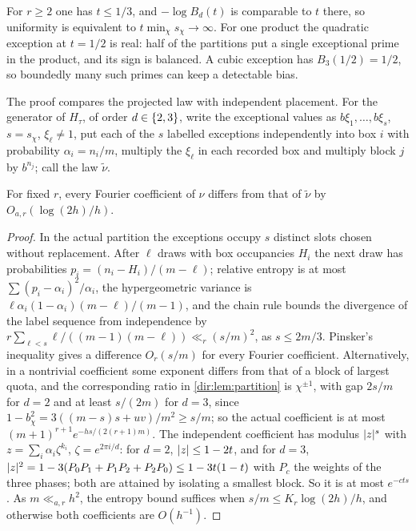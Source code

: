 For $r\ge2$ one has $t\le1/3$, and $-\log B_d(t)$ is comparable to $t$ there, so uniformity is
equivalent to $t\min_\chi s_\chi\to\infty$. For one product the quadratic exception at $t=1/2$ is real:
half of the partitions put a single exceptional prime in the product, and its sign is balanced. A
cubic exception has $B_3(1/2)=1/2$, so boundedly many such primes can keep a detectable bias.

The proof compares the projected law with independent placement. For the generator of $H_\tau$, of
order $d\in\{2,3\}$, write the exceptional values as $b\xi_1,\dots,b\xi_s$, $s=s_\chi$, $\xi_\ell\ne1$,
put each of the $s$ labelled exceptions independently into box $i$ with probability $\alpha_i=n_i/m$,
multiply the $\xi_\ell$ in each recorded box and multiply block $j$ by $b^{n_j}$; call the law
$\widetilde\nu$.

\begin{lemma}\label{dir:lem:disjoint-iid}
For fixed $r$, every Fourier coefficient of $\nu$ differs from that of $\widetilde\nu$ by
$O_{a,r}(\log(2h)/h)$.
\end{lemma}
\begin{proof}
In the actual partition the exceptions occupy $s$ distinct slots chosen without replacement. After
$\ell$ draws with box occupancies $H_i$ the next draw has probabilities $p_i=(n_i-H_i)/(m-\ell)$;
relative entropy is at most $\sum(p_i-\alpha_i)^2/\alpha_i$, the hypergeometric variance is
$\ell\alpha_i(1-\alpha_i)(m-\ell)/(m-1)$, and the chain rule bounds the divergence of the label
sequence from independence by $r\sum_{\ell<s}\ell/((m-1)(m-\ell))\ll_r(s/m)^2$, as $s\le2m/3$. Pinsker's
inequality gives a difference $O_r(s/m)$ for every Fourier coefficient. Alternatively, in a nontrivial
coefficient some exponent differs from that of a block of largest quota, and the corresponding ratio in
\cref{dir:lem:partition} is $\chi^{\pm1}$, with gap $2s/m$ for $d=2$ and at least $s/(2m)$ for $d=3$,
since $1-b_\chi^2=3((m-s)s+uv)/m^2\ge s/m$; so the actual coefficient is at most
$(m+1)^{r+1}e^{-hs/(2(r+1)m)}$. The independent coefficient has modulus $\lvert z\rvert^s$ with
$z=\sum_i\alpha_i\zeta^{k_i}$, $\zeta=e^{2\pi i/d}$: for $d=2$, $\lvert z\rvert\le1-2t$, and for $d=3$,
$\lvert z\rvert^2=1-3(P_0P_1+P_1P_2+P_2P_0)\le1-3t(1-t)$ with $P_c$ the weights of the three phases; both are
attained by isolating a smallest block. So it is at most $e^{-cts}$. As $m\ll_{a,r}h^2$, the entropy
bound suffices when $s/m\le K_r\log(2h)/h$, and otherwise both coefficients are $O(h^{-1})$.
\end{proof}

